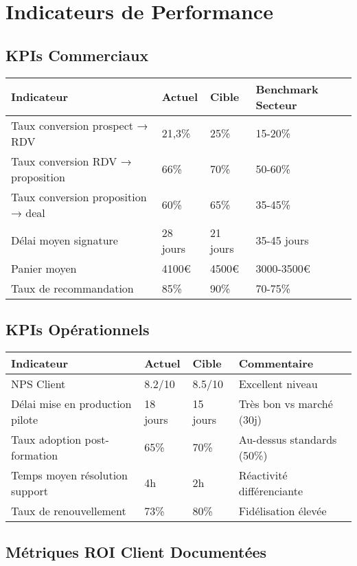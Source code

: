 \section{Indicateurs de Performance}

\subsection{KPIs Commerciaux}

\begin{longtable}{@{}p{5cm}p{3cm}p{3cm}p{3cm}@{}}
\toprule
\textbf{Indicateur} & \textbf{Actuel} & \textbf{Cible} & \textbf{Benchmark Secteur} \\
\midrule
Taux conversion prospect → RDV & 21,3\% & 25\% & 15-20\% \\
Taux conversion RDV → proposition & 66\% & 70\% & 50-60\% \\
Taux conversion proposition → deal & 60\% & 65\% & 35-45\% \\
Délai moyen signature & 28 jours & 21 jours & 35-45 jours \\
Panier moyen & 4100€ & 4500€ & 3000-3500€ \\
Taux de recommandation & 85\% & 90\% & 70-75\% \\
\bottomrule
\end{longtable}

\subsection{KPIs Opérationnels}

\begin{longtable}{@{}p{5cm}p{3cm}p{3cm}p{3cm}@{}}
\toprule
\textbf{Indicateur} & \textbf{Actuel} & \textbf{Cible} & \textbf{Commentaire} \\
\midrule
NPS Client & 8.2/10 & 8.5/10 & Excellent niveau \\
Délai mise en production pilote & 18 jours & 15 jours & Très bon vs marché (30j) \\
Taux adoption post-formation & 65\% & 70\% & Au-dessus standards (50\%) \\
Temps moyen résolution support & 4h & 2h & Réactivité différenciante \\
Taux de renouvellement & 73\% & 80\% & Fidélisation élevée \\
\bottomrule
\end{longtable}

\subsection{Métriques ROI Client Documentées}

